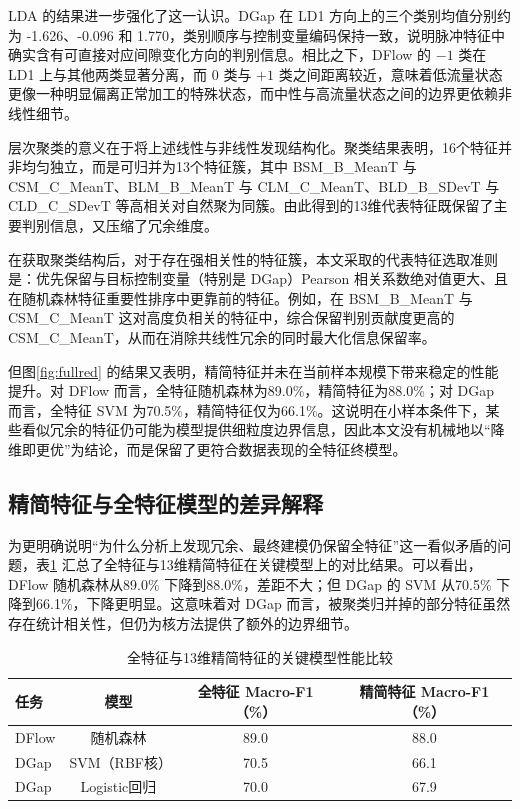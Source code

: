 \documentclass[UTF8,a4paper,12pt]{ctexart}
\begin{document}
LDA 的结果进一步强化了这一认识。DGap 在 LD1 方向上的三个类别均值分别约为 -1.626、-0.096 和 1.770，类别顺序与控制变量编码保持一致，说明脉冲特征中确实含有可直接对应间隙变化方向的判别信息。相比之下，DFlow 的 $-1$ 类在 LD1 上与其他两类显著分离，而 $0$ 类与 $+1$ 类之间距离较近，意味着低流量状态更像一种明显偏离正常加工的特殊状态，而中性与高流量状态之间的边界更依赖非线性细节。

层次聚类的意义在于将上述线性与非线性发现结构化。聚类结果表明，16个特征并非均匀独立，而是可归并为13个特征簇，其中 BSM\_B\_MeanT 与 CSM\_C\_MeanT、BLM\_B\_MeanT 与 CLM\_C\_MeanT、BLD\_B\_SDevT 与 CLD\_C\_SDevT 等高相关对自然聚为同簇。由此得到的13维代表特征既保留了主要判别信息，又压缩了冗余维度。

在获取聚类结构后，对于存在强相关性的特征簇，本文采取的代表特征选取准则是：优先保留与目标控制变量（特别是 DGap）Pearson 相关系数绝对值更大、且在随机森林特征重要性排序中更靠前的特征。例如，在 BSM_B_MeanT 与 CSM_C_MeanT 这对高度负相关的特征中，综合保留判别贡献度更高的 CSM_C_MeanT，从而在消除共线性冗余的同时最大化信息保留率。

但图\ref{fig:fullred} 的结果又表明，精简特征并未在当前样本规模下带来稳定的性能提升。对 DFlow 而言，全特征随机森林为89.0\%，精简特征为88.0\%；对 DGap 而言，全特征 SVM 为70.5\%，精简特征仅为66.1\%。这说明在小样本条件下，某些看似冗余的特征仍可能为模型提供细粒度边界信息，因此本文没有机械地以“降维即更优”为结论，而是保留了更符合数据表现的全特征终模型。

\subsection{精简特征与全特征模型的差异解释}

为更明确说明“为什么分析上发现冗余、最终建模仍保留全特征”这一看似矛盾的问题，表\ref{tab:fullred} 汇总了全特征与13维精简特征在关键模型上的对比结果。可以看出，DFlow 随机森林从89.0\% 下降到88.0\%，差距不大；但 DGap 的 SVM 从70.5\% 下降到66.1\%，下降更明显。这意味着对 DGap 而言，被聚类归并掉的部分特征虽然存在统计相关性，但仍为核方法提供了额外的边界细节。

\begin{table}[H]
\centering
\caption{全特征与13维精简特征的关键模型性能比较}
\label{tab:fullred}
\begin{tabular}{lccc}
\toprule
任务 & 模型 & 全特征 Macro-F1（\%） & 精简特征 Macro-F1（\%） \\
\midrule
DFlow & 随机森林 & 89.0 & 88.0 \\
DGap & SVM（RBF核） & 70.5 & 66.1 \\
DGap & Logistic回归 & 70.0 & 67.9 \\
\bottomrule
\end{tabular}
\end{table}
\end{document}
